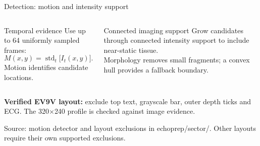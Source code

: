 \documentclass[aspectratio=169,10pt]{beamer}
\newcommand{\source}[1]{\par\vfill{\fontsize{6.1}{8}\selectfont\color{Muted}#1\par}}
\begin{document}
\begin{frame}[t]{Detection: motion and intensity support}
  \begin{columns}[T,onlytextwidth]
    \begin{block}{Temporal evidence}\small
      Use up to 64 uniformly sampled frames:
      \[
        M(x,y)=\operatorname{std}_{t}\bigl[I_t(x,y)\bigr].
      \]
      Motion identifies candidate locations.
    \end{block}
    \begin{block}{Connected imaging support}\small
      Grow candidates through connected intensity support to include near-static tissue.\\[5pt]
      Morphology removes small fragments; a convex hull provides a fallback boundary.
    \end{block}
  \end{columns}
  \vspace{5pt}
  \begin{center}
  \end{center}
  \small\textbf{Verified EV9V layout:} exclude top text, grayscale bar, outer depth ticks and ECG. The 320$\times$240 profile is checked against image evidence.
  \source{Source: motion detector and layout exclusions in echoprep/sector/. Other layouts require their own supported exclusions.}
\end{frame}
\end{document}
